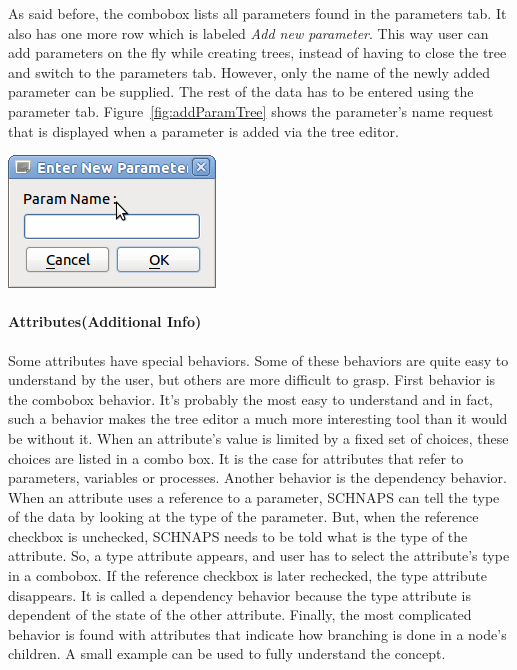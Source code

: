 \documentclass[a4paper,11pt]{report}
\begin{document}
As said before, the combobox lists all parameters found in the parameters tab. It also has one more row which is labeled \emph{Add new parameter}. This way user can add parameters on the fly while creating trees, instead of having to close the tree and switch to the parameters tab. However, only the name of the newly added parameter can be supplied. The rest of the data has to be entered using the parameter tab. Figure~\ref{fig:addParamTree} shows the parameter's name request that is displayed when a parameter is added via the tree editor.

\begin{center}
\includegraphics[scale=0.4]{Pictures/TreeEditor/addParam.png}
\label{fig:addParamTree}
\end{center}

\paragraph{Attributes(Additional Info)}
Some attributes have special behaviors. Some of these behaviors are quite easy to understand by the user, but others are more difficult to grasp. First behavior is the combobox behavior. It's probably the most easy to understand and in fact, such a behavior makes the tree editor a much more interesting tool than it would be without it. When an attribute's value is limited by a fixed set of choices, these choices are listed in a combo box. It is the case for attributes that refer to parameters, variables or processes.
Another behavior is the dependency behavior. When an attribute uses a reference to a parameter, SCHNAPS can tell the type of the data by looking at the type of the parameter. But, when the reference checkbox is unchecked, SCHNAPS needs to be told what is the type of the attribute. So, a type attribute appears, and user has to select the attribute's type in a combobox. If the reference checkbox is later rechecked, the type attribute disappears. It is called a dependency behavior because the type attribute is dependent of the state of the other attribute.
Finally, the most complicated behavior is found with attributes that indicate how branching is done in a node's children. A small example can be used to fully understand the concept.
\end{document}
